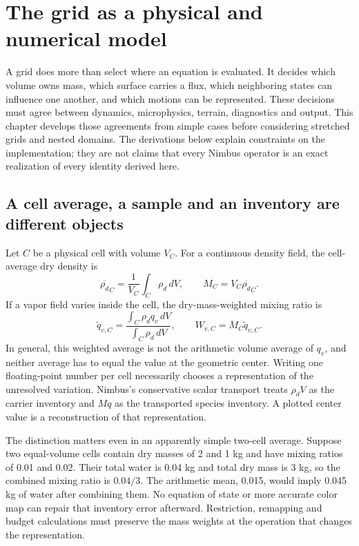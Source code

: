 \chapter{The grid as a physical and numerical model}\label{grid-deep-dive}

A grid does more than select where an equation is evaluated. It decides which
volume owns mass, which surface carries a flux, which neighboring states can
influence one another, and which motions can be represented. These decisions
must agree between dynamics, microphysics, terrain, diagnostics and output.
This chapter develops those agreements from simple cases before considering
stretched grids and nested domains. The derivations below explain constraints
on the implementation; they are not claims that every Nimbus operator is an
exact realization of every identity derived here.

\section{A cell average, a sample and an inventory are different objects}

Let $C$ be a physical cell with volume $V_C$. For a continuous density field,
the cell-average dry density is
\[
 \overline{\rho_d}_C=\frac{1}{V_C}\int_C\rho_d\,dV,
 \qquad M_C=V_C\overline{\rho_d}_C.
\]
If a vapor field varies inside the cell, the dry-mass-weighted mixing ratio is
\[
 \widetilde q_{v,C}
 =\frac{\int_C\rho_d q_v\,dV}{\int_C\rho_d\,dV},
 \qquad W_{v,C}=M_C\widetilde q_{v,C}.
\]
In general, this weighted average is not the arithmetic volume average of
$q_v$, and neither average has to equal the value at the geometric center.
Writing one floating-point number per cell necessarily chooses a representation
of the unresolved variation. Nimbus's conservative scalar transport treats
$\rho_d V$ as the carrier inventory and $Mq$ as the transported species
inventory. A plotted center value is a reconstruction of that representation.

The distinction matters even in an apparently simple two-cell average. Suppose
two equal-volume cells contain dry masses of 2 and 1 kg and have mixing ratios
of 0.01 and 0.02. Their total water is 0.04 kg and total dry mass is 3 kg, so the
combined mixing ratio is $0.04/3$. The arithmetic mean, 0.015, would imply
0.045 kg of water after combining them. No equation of state or more accurate
color map can repair that inventory error afterward. Restriction, remapping
and budget calculations must preserve the mass weights at the operation that
changes the representation.

